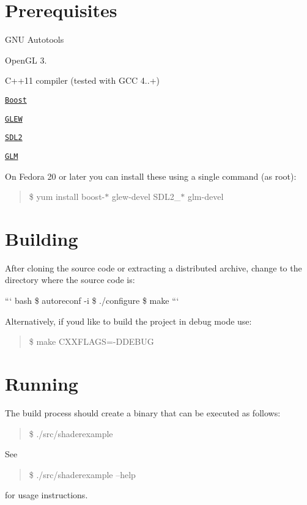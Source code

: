 

\section*{Prerequisites}


\begin{DoxyItemize}
\item G\+N\+U Autotools
\item Open\+G\+L 3.
\item C++11 compiler (tested with G\+C\+C 4..+)
\item \href{http://www.boost.org/}{\tt Boost}
\item \href{http://glew.sourceforge.net/}{\tt G\+L\+E\+W}
\item \href{https://www.libsdl.org/}{\tt S\+D\+L2}
\item \href{http://glm.g-truc.net/}{\tt G\+L\+M}
\end{DoxyItemize}

On Fedora 20 or later you can install these using a single command (as root)\+:

\begin{quote}
\$ yum install boost-\/$\ast$ glew-\/devel S\+D\+L2\+\_\+$\ast$ glm-\/devel \end{quote}


\section*{Building}

After cloning the source code or extracting a distributed archive, change to the directory where the source code is\+:

``` bash \$ autoreconf -\/i \$ ./configure \$ make ```

Alternatively, if you\textquotesingle{}d like to build the project in debug mode use\+:

\begin{quote}
\$ make C\+X\+X\+F\+L\+A\+G\+S=-\/\+D\+D\+E\+B\+U\+G \end{quote}


\section*{Running}

The build process should create a binary that can be executed as follows\+:

\begin{quote}
\$ ./src/shaderexample \end{quote}


See

\begin{quote}
\$ ./src/shaderexample --help \end{quote}


for usage instructions. 